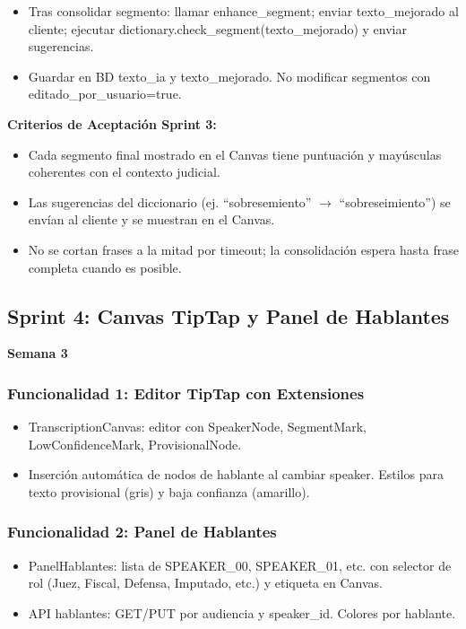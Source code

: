 \documentclass[12pt,a4paper]{report}
\begin{document}
\begin{itemize}
    \item Tras consolidar segmento: llamar enhance\_segment; enviar texto\_mejorado al cliente; ejecutar dictionary.check\_segment(texto\_mejorado) y enviar sugerencias.
    \item Guardar en BD texto\_ia y texto\_mejorado. No modificar segmentos con editado\_por\_usuario=true.
\end{itemize}

\textbf{Criterios de Aceptación Sprint 3:}
\begin{itemize}
    \item Cada segmento final mostrado en el Canvas tiene puntuación y mayúsculas coherentes con el contexto judicial.
    \item Las sugerencias del diccionario (ej. ``sobresemiento'' $\to$ ``sobreseimiento'') se envían al cliente y se muestran en el Canvas.
    \item No se cortan frases a la mitad por timeout; la consolidación espera hasta frase completa cuando es posible.
\end{itemize}

\subsection{Sprint 4: Canvas TipTap y Panel de Hablantes}

\textbf{Semana 3}

\subsubsection{Funcionalidad 1: Editor TipTap con Extensiones}

\begin{itemize}
    \item TranscriptionCanvas: editor con SpeakerNode, SegmentMark, LowConfidenceMark, ProvisionalNode.
    \item Inserción automática de nodos de hablante al cambiar speaker. Estilos para texto provisional (gris) y baja confianza (amarillo).
\end{itemize}

\subsubsection{Funcionalidad 2: Panel de Hablantes}

\begin{itemize}
    \item PanelHablantes: lista de SPEAKER\_00, SPEAKER\_01, etc. con selector de rol (Juez, Fiscal, Defensa, Imputado, etc.) y etiqueta en Canvas.
    \item API hablantes: GET/PUT por audiencia y speaker\_id. Colores por hablante.
\end{itemize}
\end{document}
